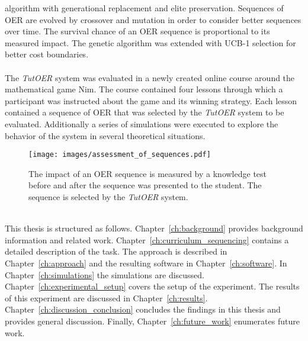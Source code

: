 algorithm with generational replacement and elite preservation. Sequences of
OER are evolved by crossover and mutation in order to consider better sequences
over time. The survival chance of an OER sequence is proportional to its
measured impact. The genetic algorithm was extended with UCB-1 selection
\citep{Auer2002} for better cost boundaries.\\\\
\noindent
The \emph{TutOER} system was evaluated in a newly created online course around
the mathematical game Nim. The course contained four lessons through which a
participant was instructed about the game and its winning strategy. Each lesson
contained a sequence of OER that was selected by the \emph{TutOER} system to be
evaluated. Additionally a series of simulations were executed to explore
the behavior of the system in several theoretical situations.\\
\begin{figure}[h!]
	\begin{framed}
	\centering
	\texttt{[image: images/assessment\_of\_sequences.pdf]}
	\caption[Setup of assessments of impact OER]{The impact of an OER sequence
		is measured by a knowledge test before and after the
	sequence was presented to the student. The sequence is selected by the
	\emph{TutOER} system.}
	\label{fig:assessment_of_sequences}
	\end{framed}
\end{figure}\\
\noindent
This thesis is structured as follows. Chapter~\ref{ch:background} provides
background information and related work. Chapter~\ref{ch:curriculum_sequencing}
contains a detailed description of the task. The approach is described in
Chapter~\ref{ch:approach} and the resulting software in
Chapter~\ref{ch:software}. In Chapter~\ref{ch:simulations} the simulations are
discussed. Chapter~\ref{ch:experimental_setup} covers the setup
of the experiment. The results of this experiment are discussed in
Chapter~\ref{ch:results}. Chapter~\ref{ch:discussion_conclusion} concludes the
findings in this thesis and provides general discussion. Finally,
Chapter~\ref{ch:future_work} enumerates future work.

